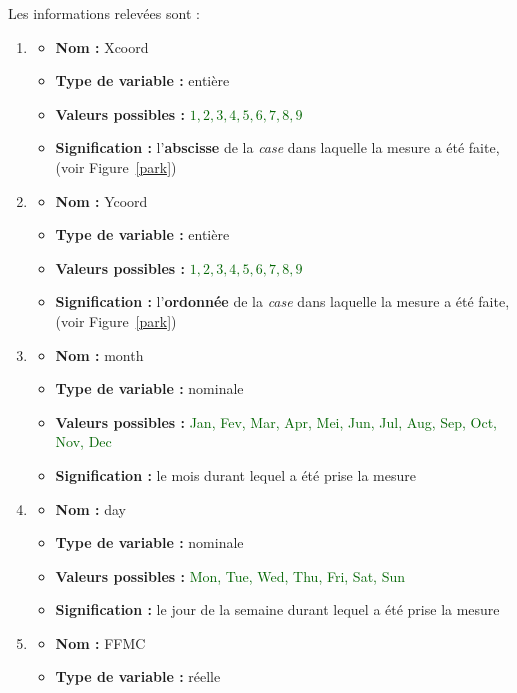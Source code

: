 \documentclass{article}
\newcommand{\titre}[1]{\textcolor{title}{#1}}
\newcommand{\gre}[1]{\textcolor{darkgreen}{#1}}
\begin{document}
\begin{sffamily}
Les informations relevées sont :
\begin{enumerate}
\item \begin{itemize}
	\item \textbf{Nom : }\titre{Xcoord}
	\item \textbf{Type de variable : }entière
	\item \textbf{Valeurs possibles : }\gre{$1,2,3,4,5,6,7,8,9$}
	\item \textbf{Signification : }l'\textbf{abscisse} de la \textit{case} dans laquelle la mesure a été faite, (voir 
	Figure~\ref{park})
	\end{itemize}
\item \begin{itemize}
	\item \textbf{Nom : }\titre{Ycoord}
	\item \textbf{Type de variable : }entière
	\item \textbf{Valeurs possibles : }\gre{$1,2,3,4,5,6,7,8,9$}
	\item \textbf{Signification : }l'\textbf{ordonnée} de la \textit{case} dans laquelle la mesure a été faite, (voir 
	Figure~\ref{park})
	\end{itemize}	
\item \begin{itemize}
	\item \textbf{Nom : }\titre{month}
	\item \textbf{Type de variable : }nominale
	\item \textbf{Valeurs possibles : }\gre{Jan, Fev, Mar, Apr, Mei, Jun, Jul, Aug, Sep, Oct, Nov, Dec}
	\item \textbf{Signification : }le mois durant lequel a été prise la mesure
	\end{itemize}
\item \begin{itemize}
	\item \textbf{Nom : }\titre{day}
	\item \textbf{Type de variable : }nominale
	\item \textbf{Valeurs possibles : }\gre{Mon, Tue, Wed, Thu, Fri, Sat, Sun}
	\item \textbf{Signification : }le jour de la semaine durant lequel a été prise la mesure
	\end{itemize}
\item \begin{itemize}
	\item \textbf{Nom : }\titre{FFMC}
	\item \textbf{Type de variable : }réelle

\end{itemize}
\end{enumerate}
\end{sffamily}
\end{document}
